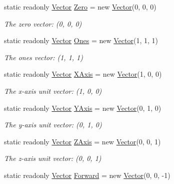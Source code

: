 \begin{DoxyCompactItemize}
\item 
static readonly \mbox{\hyperlink{struct_leap_1_1_vector}{Vector}} \mbox{\hyperlink{struct_leap_1_1_vector_a007c4ee68aa890118b7a2d24aa4d9a6b}{Zero}} = new \mbox{\hyperlink{struct_leap_1_1_vector}{Vector}}(0, 0, 0)
\begin{DoxyCompactList}\small\item\em The zero vector\+: (0, 0, 0) \end{DoxyCompactList}\item 
static readonly \mbox{\hyperlink{struct_leap_1_1_vector}{Vector}} \mbox{\hyperlink{struct_leap_1_1_vector_a0eb4303bb2650290ac5ca18f1e59563d}{Ones}} = new \mbox{\hyperlink{struct_leap_1_1_vector}{Vector}}(1, 1, 1)
\begin{DoxyCompactList}\small\item\em The ones vector\+: (1, 1, 1) \end{DoxyCompactList}\item 
static readonly \mbox{\hyperlink{struct_leap_1_1_vector}{Vector}} \mbox{\hyperlink{struct_leap_1_1_vector_ad62a202318bf591b431928859449b19c}{X\+Axis}} = new \mbox{\hyperlink{struct_leap_1_1_vector}{Vector}}(1, 0, 0)
\begin{DoxyCompactList}\small\item\em The x-\/axis unit vector\+: (1, 0, 0) \end{DoxyCompactList}\item 
static readonly \mbox{\hyperlink{struct_leap_1_1_vector}{Vector}} \mbox{\hyperlink{struct_leap_1_1_vector_abf07de0f419b3de5776e046d35c0843e}{Y\+Axis}} = new \mbox{\hyperlink{struct_leap_1_1_vector}{Vector}}(0, 1, 0)
\begin{DoxyCompactList}\small\item\em The y-\/axis unit vector\+: (0, 1, 0) \end{DoxyCompactList}\item 
static readonly \mbox{\hyperlink{struct_leap_1_1_vector}{Vector}} \mbox{\hyperlink{struct_leap_1_1_vector_a2b2f1a3a9334e812e832e3b1b6cd4384}{Z\+Axis}} = new \mbox{\hyperlink{struct_leap_1_1_vector}{Vector}}(0, 0, 1)
\begin{DoxyCompactList}\small\item\em The z-\/axis unit vector\+: (0, 0, 1) \end{DoxyCompactList}\item 
static readonly \mbox{\hyperlink{struct_leap_1_1_vector}{Vector}} \mbox{\hyperlink{struct_leap_1_1_vector_a2ec88fe91f8086e18e78ee2dcc078525}{Forward}} = new \mbox{\hyperlink{struct_leap_1_1_vector}{Vector}}(0, 0, -\/1)

\end{DoxyCompactItemize}
